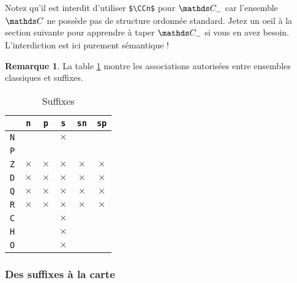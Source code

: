 \documentclass[12pt,a4paper]{article}
\theoremstyle{definition}
\newtheorem*{remark}{Remarque}
\begin{document}
Notez qu'il est interdit d'utiliser \verb+$\CCn$+ pour $\specialset{\CC}{n}$ car l'ensemble $\CC$ ne possède pas de structure ordonnée standard. Jetez un oeil à la section suivante pour apprendre à taper $\specialset{\CC}{n}$ si vous en avez besoin. L'interdiction est ici purement sémantique !

\medskip

\begin{remark}
	La table \ref{table:suffixes-sets}  montre les associations autorisées entre ensembles classiques et suffixes.
\end{remark}


\newcommand\xx{\phantom{$\times$}}
\begin{table}[h]
    \caption{Suffixes}
    \begin{center}
        \begin{tabular}{c|c|c|c|c|c}
              & \verb+n+ & \verb+p+ & \verb+s+ & \verb+sn+ & \verb+sp+ \\
            \hline \verb+N+ & \xx & \xx & $\times$ & \xx & \xx \\
            \hline \verb+P+ & \xx & \xx & \xx & \xx & \xx \\
            \hline \verb+Z+ & $\times$ & $\times$ & $\times$ & $\times$ & $\times$ \\
            \hline \verb+D+ & $\times$ & $\times$ & $\times$ & $\times$ & $\times$ \\
            \hline \verb+Q+ & $\times$ & $\times$ & $\times$ & $\times$ & $\times$ \\
            \hline \verb+R+ & $\times$ & $\times$ & $\times$ & $\times$ & $\times$ \\
            \hline \verb+C+ & \xx & \xx & $\times$ & \xx & \xx \\
            \hline \verb+H+ & \xx & \xx & $\times$ & \xx & \xx \\
            \hline \verb+O+ & \xx & \xx & $\times$ & \xx & \xx \\
        \end{tabular}
    \end{center}
    \label{table:suffixes-sets}
\end{table}




        \subsubsection{Des suffixes à la carte}
\end{document}
